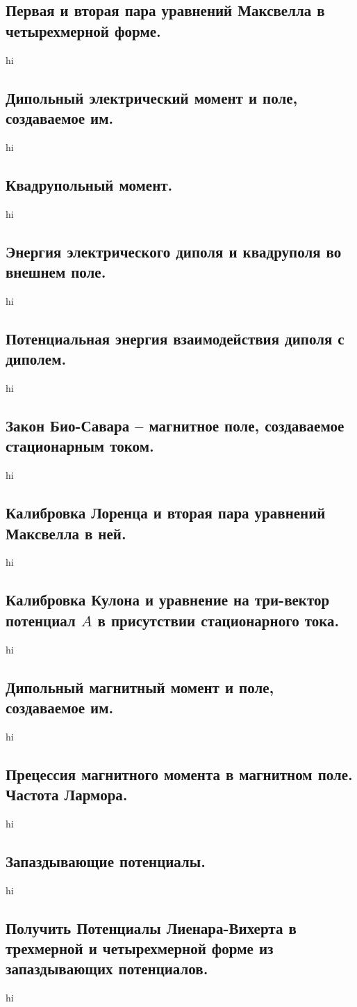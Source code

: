 \documentclass[a4paper,12pt]{article}
\begin{document}
\subsection{Первая и вторая пара уравнений Максвелла в четырехмерной форме.}
hi
\subsection{Дипольный электрический момент и поле, создаваемое им.}
hi
\subsection{Квадрупольный момент.}
hi
\subsection{Энергия электрического диполя и квадруполя во внешнем поле.}
hi
\subsection{Потенциальная энергия взаимодействия диполя с диполем.}
hi
\subsection{Закон Био-Савара – магнитное поле, создаваемое стационарным током.}
hi
\subsection{Калибровка Лоренца и вторая пара уравнений Максвелла в ней.}
hi
\subsection{Калибровка Кулона и уравнение на три-вектор потенциал $A$ в
присутствии стационарного тока.}
hi
\subsection{Дипольный магнитный момент и поле, создаваемое им.}
hi
\subsection{Прецессия магнитного момента в магнитном поле. Частота Лармора.}
hi
\subsection{Запаздывающие потенциалы.}
hi
\subsection{Получить Потенциалы Лиенара-Вихерта в трехмерной и четырехмерной
форме из запаздывающих потенциалов.}
hi
\end{document}
